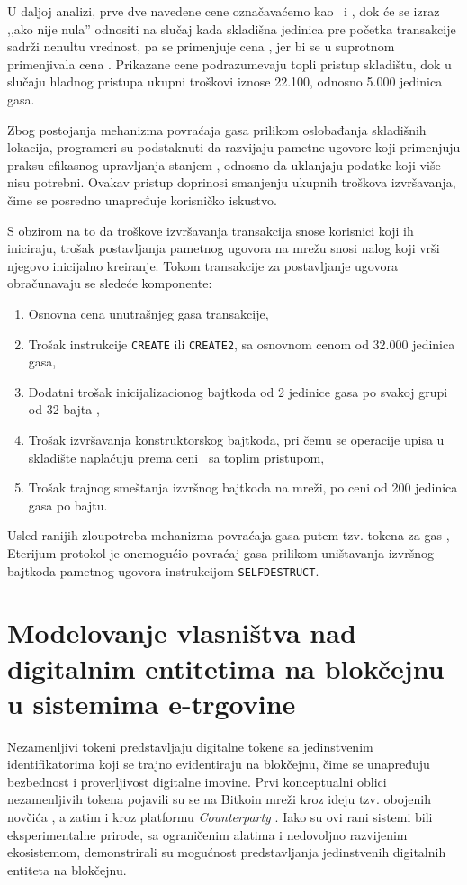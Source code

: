 U daljoj analizi, prve dve navedene cene označavaćemo kao \Sj\ i \Sd, dok će se izraz ,,ako nije nula'' odnositi na slučaj kada skladišna jedinica pre početka transakcije sadrži nenultu vrednost, pa se primenjuje cena \Sd, jer bi se u suprotnom primenjivala cena \Sj. Prikazane cene podrazumevaju topli pristup skladištu, dok u slučaju hladnog pristupa ukupni troškovi iznose 22.100, odnosno 5.000 jedinica gasa.

Zbog postojanja mehanizma povraćaja gasa prilikom oslobađanja skladišnih lokacija, programeri su podstaknuti da razvijaju pametne ugovore koji primenjuju praksu efikasnog upravljanja stanjem \cite{SELFDESTRUCTeip3529}, odnosno da uklanjaju podatke koji više nisu potrebni. Ovakav pristup doprinosi smanjenju ukupnih troškova izvršavanja, čime se posredno unapređuje korisničko iskustvo.

S obzirom na to da troškove izvršavanja transakcija snose korisnici koji ih iniciraju, trošak postavljanja pametnog ugovora na mrežu snosi nalog koji vrši njegovo inicijalno kreiranje. Tokom transakcije za postavljanje ugovora obračunavaju se sledeće komponente:
\begin{enumerate}
\item Osnovna cena unutrašnjeg gasa transakcije,
\item Trošak instrukcije \texttt{CREATE} ili \texttt{CREATE2}, sa osnovnom cenom od 32.000 jedinica gasa,
\item Dodatni trošak inicijalizacionog bajtkoda od 2 jedinice gasa po svakoj grupi od 32 bajta \cite{DEPLOYMENTeip3860},
\item Trošak izvršavanja konstruktorskog bajtkoda, pri čemu se operacije upisa u skladište naplaćuju prema ceni \Sj\ sa toplim pristupom,
\item Trošak trajnog smeštanja izvršnog bajtkoda na mreži, po ceni od 200 jedinica gasa po bajtu.
\end{enumerate}

Usled ranijih zloupotreba mehanizma povraćaja gasa putem tzv. tokena za gas \cite{luo2022understanding}, Eterijum protokol je onemogućio povraćaj gasa prilikom uništavanja izvršnog bajtkoda pametnog ugovora instrukcijom \texttt{SELFDESTRUCT}.

\section{Modelovanje vlasništva nad digitalnim entitetima na blokčejnu u sistemima e-trgovine}
Nezamenljivi tokeni  predstavljaju digitalne tokene sa jedinstvenim identifikatorima koji se trajno evidentiraju na blokčejnu, čime se unapređuju bezbednost i proverljivost digitalne imovine. Prvi konceptualni oblici nezamenljivih tokena pojavili su se na Bitkoin mreži kroz ideju tzv. obojenih novčića \cite{rosenfeld2012overview} , a zatim i kroz platformu \textit{Counterparty} \cite{ko2024survey}. Iako su ovi rani sistemi bili eksperimentalne prirode, sa ograničenim alatima i nedovoljno razvijenim ekosistemom, demonstrirali su mogućnost predstavljanja jedinstvenih digitalnih entiteta na blokčejnu.

